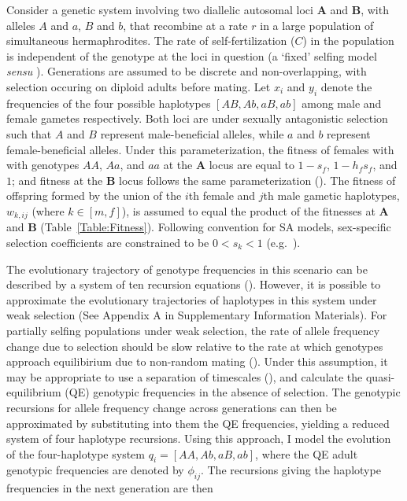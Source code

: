 \documentclass{article}
\begin{document}
Consider a genetic system involving two diallelic autosomal loci $\mathbf{A}$ and $\mathbf{B}$, with alleles $A$ and $a$, $B$ and $b$, that recombine at a rate $r$ in a large population of simultaneous hermaphrodites. The rate of self-fertilization ($C$) in the population is independent of the genotype at the loci in question (a `fixed' selfing model \textit{sensu} \citealt{Holden1979,CaballeroHill1992, JordanConn2014}). Generations are assumed to be discrete and non-overlapping, with selection occuring on diploid adults before mating. Let $x_i$ and $y_i$ denote the frequencies of the four possible haplotypes $[AB, Ab, aB, ab]$ among male and female gametes respectively. Both loci are under sexually antagonistic selection such that $A$ and $B$ represent male-beneficial alleles, while $a$ and $b$ represent female-beneficial alleles. Under this parameterization, the fitness of females with with genotypes $AA$, $Aa$, and $aa$ at the $\mathbf{A}$ locus are equal to $1 - s_f$, $1 - h_f s_f$, and $1$; and fitness at the $\mathbf{B}$ locus follows the same parameterization (\citealt{Kidwell1977}). The fitness of offspring formed by the union of the $i$th female and $j$th male gametic haplotypes, $w_{k,ij}$ (where $k \in [m,f]$), is assumed to equal the product of the fitnesses at $\mathbf{A}$ and $\mathbf{B}$ (Table~\ref{Table:Fitness}). Following convention for SA models, sex-specific selection coefficients are constrained to be $0 < s_k < 1$ (e.g.~\citealt{Kidwell1977}).

The evolutionary trajectory of genotype frequencies in this scenario can be described by a system of ten recursion equations (\citealt{Holden1979, JordanConn2014}). However, it is possible to approximate the evolutionary trajectories of haplotypes in this system under weak selection (See Appendix A in Supplementary Information Materials). For partially selfing populations under weak selection, the rate of allele frequency change due to selection should be slow relative to the rate at which genotypes approach equilibirium due to non-random mating (\citealt{Nagylaki1997}). Under this assumption, it may be appropriate to use a separation of timescales (\citealt{OttoDay2007}), and calculate the quasi-equilibrium (QE) genotypic frequencies in the absence of selection. The genotypic recursions for allele frequency change across generations can then be approximated by substituting into them the QE frequencies, yielding a reduced system of four haplotype recursions. Using this approach, I model the evolution of the four-haplotype system $q_i = [AA, Ab, aB, ab]$, where the QE adult genotypic frequencies are denoted by $\phi_{ij}$. The recursions giving the haplotype frequencies in the next generation are then
\end{document}
